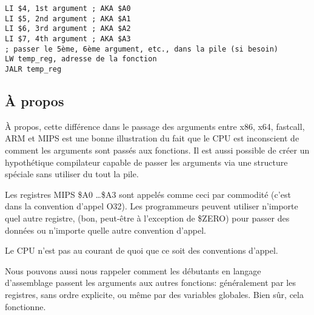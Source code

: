 \begin{lstlisting}[caption=MIPS (O32 calling convention),style=customasmMIPS]
LI $4, 1st argument ; AKA $A0
LI $5, 2nd argument ; AKA $A1
LI $6, 3rd argument ; AKA $A2
LI $7, 4th argument ; AKA $A3
; passer le 5ème, 6ème argument, etc., dans la pile (si besoin)
LW temp_reg, adresse de la fonction
JALR temp_reg
\end{lstlisting}

\subsection{À propos}

À propos, cette différence dans le passage des arguments entre x86, x64, fastcall, ARM
et MIPS est une bonne illustration du fait que le CPU est inconscient de comment
les arguments sont passés aux fonctions.
Il est aussi possible de créer un hypothétique compilateur capable de passer les
arguments via une structure spéciale sans utiliser du tout la pile.

Les registres MIPS \$A0 \dots \$A3 sont appelés comme ceci par commodité (c'est
dans la convention d'appel O32).
Les programmeurs peuvent utiliser n'importe quel autre registre, (bon, peut-être
à l'exception de \$ZERO) pour passer des données ou n'importe quelle autre convention d'appel.

Le \ac{CPU} n'est pas au courant de quoi que ce soit des conventions d'appel.

Nous pouvons aussi nous rappeler comment les débutants en langage d'assemblage passent
les arguments aux autres fonctions: généralement par les registres, sans ordre explicite,
ou même par des variables globales.
Bien sûr, cela fonctionne.

